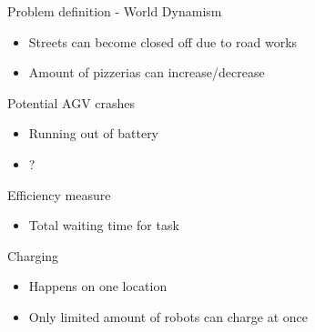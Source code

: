 \begin{frame}{Problem definition - World}
    Dynamism
    \begin{itemize}
        \item Streets can become closed off due to road works
        \item Amount of pizzerias can increase/decrease
    \end{itemize}

    Potential AGV crashes
    \begin{itemize}
        \item Running out of battery
        \item ?
    \end{itemize}

    Efficiency measure
    \begin{itemize}
        \item Total waiting time for task
    \end{itemize}

    Charging
    \begin{itemize}
        \item Happens on one location
        \item Only limited amount of robots can charge at once
    \end{itemize}
\end{frame}
